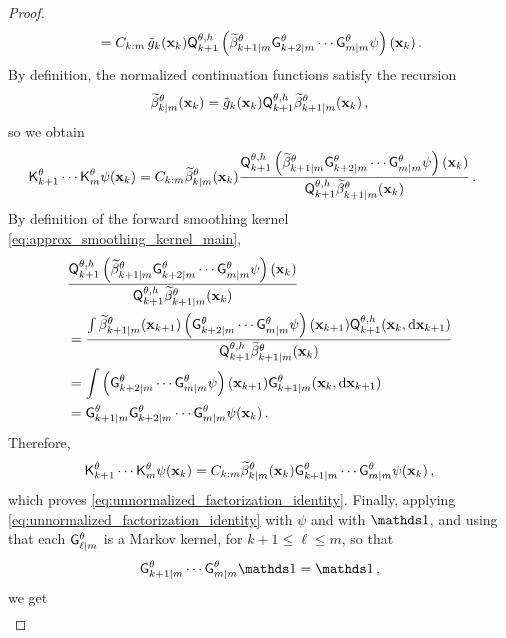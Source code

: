\documentclass[11pt]{article}
\theoremstyle{plain}
\theoremstyle{definition}
\theoremstyle{remark}
\begin{document}
\begin{proof}
\begin{align*}
&\quad = C_{k:m}\, \potnorm{k}(\x_k) \mk{k+1}[\theta,h] \left( \normbackwardfun{k+1}{m}[\theta] \fsmk{k+2}{m}[\theta]\cdots \fsmk{m}{m}[\theta]\psi \right)(\x_k) \eqsp.
\end{align*}
%
By definition, the normalized continuation functions satisfy the recursion 
$$\normbackwardfun{k}{m}[\theta](\x_k) = \potnorm{k} (\x_k) \mk{k+1}[\theta,h] \normbackwardfun{k+1}{m}[\theta](\x_k) \eqsp, $$
so we obtain
\begin{align*}
\unpredictive{k+1}[\theta]\cdots \unpredictive{m}[\theta]\psi(\x_k)
&= C_{k:m} \normbackwardfun{k}{m}[\theta](\x_k)  \frac{ \mk{k+1}[\theta,h] \left( \normbackwardfun{k+1}{m}[\theta] \fsmk{k+2}{m}[\theta]\cdots \fsmk{m}{m}[\theta]\psi \right)(\x_k) }{ \mk{k+1}[\theta,h]\normbackwardfun{k+1}{m}[\theta](\x_k) } \eqsp.
\end{align*}
By definition of the forward smoothing kernel \eqref{eq:approx_smoothing_kernel_main}, 
\begin{align*}
&\frac{ \mk{k+1}[\theta,h] \left( \normbackwardfun{k+1}{m}[\theta] \fsmk{k+2}{m}[\theta] \cdots \fsmk{m}{m}[\theta]\psi  \right)(\x_k) }{ \mk{k+1}[\theta,h]\normbackwardfun{k+1}{m}[\theta](\x_k) } \\
&= \frac{ \int \normbackwardfun{k+1}{m}[\theta](\x_{k+1}) \left( \fsmk{k+2}{m}[\theta] \cdots \fsmk{m}{m}[\theta]\psi \right)(\x_{k+1}) \mk{k+1}[\theta,h](\x_k,\rmd \x_{k+1}) }{ \mk{k+1}[\theta,h]\normbackwardfun{k+1}{m}[\theta](\x_k) } \\
&= \int \left(  \fsmk{k+2}{m}[\theta] \cdots \fsmk{m}{m}[\theta]\psi \right)(\x_{k+1}) \fsmk{k+1}{m}[\theta](\x_k,\rmd \x_{k+1}) \\
&= \fsmk{k+1}{m}[\theta]\fsmk{k+2}{m}[\theta] \cdots \fsmk{m}{m}[\theta]\psi(\x_k) \eqsp.
\end{align*}
%
Therefore,
\begin{align*}
\unpredictive{k+1}[\theta] \cdots \unpredictive{m}[\theta] \psi(\x_k)
=
C_{k:m} \normbackwardfun{k}{m}[\theta] (\x_k) \fsmk{k+1}{m}[\theta]\cdots \fsmk{m}{m}[\theta]\psi(\x_k) \eqsp,
\end{align*}
which proves \eqref{eq:unnormalized_factorization_identity}. Finally, applying \eqref{eq:unnormalized_factorization_identity} with $\psi$ and with $\un$, and using that each $\fsmk{\ell}{m}[\theta]$ is a Markov kernel, for $k+1\le \ell\le m$, so that
\begin{align*}
\fsmk{k+1}{m}[\theta]\cdots \fsmk{m}{m}[\theta] \un =\un \eqsp,
\end{align*}
we get
\begin{align*}

\end{align*}
\end{proof}
\end{document}
